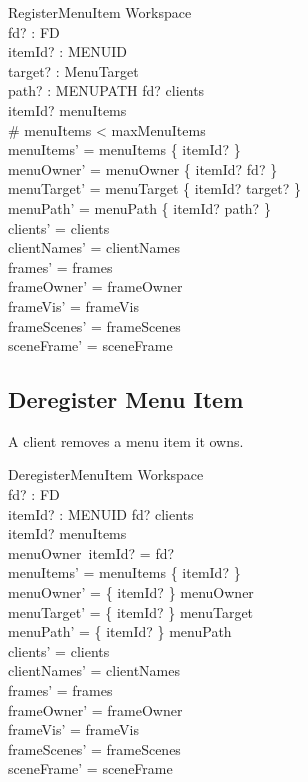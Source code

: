 \documentclass[a4paper,10pt,fleqn]{article}
\begin{document}
\begin{schema}{RegisterMenuItem}
  \Delta Workspace \\
  fd? : FD \\
  itemId? : MENUID \\
  target? : MenuTarget \\
  path? : MENUPATH
  \where
  fd? \in clients \\
  itemId? \notin menuItems \\
  \# menuItems < maxMenuItems \\
  menuItems' = menuItems \cup \{ itemId? \} \\
  menuOwner' = menuOwner \cup \{ itemId? \mapsto fd? \} \\
  menuTarget' = menuTarget \cup \{ itemId? \mapsto target? \} \\
  menuPath' = menuPath \cup \{ itemId? \mapsto path? \} \\
  clients' = clients \\
  clientNames' = clientNames \\
  frames' = frames \\
  frameOwner' = frameOwner \\
  frameVis' = frameVis \\
  frameScenes' = frameScenes \\
  sceneFrame' = sceneFrame
\end{schema}

\subsection{Deregister Menu Item}

A client removes a menu item it owns.

\begin{schema}{DeregisterMenuItem}
  \Delta Workspace \\
  fd? : FD \\
  itemId? : MENUID
  \where
  fd? \in clients \\
  itemId? \in menuItems \\
  menuOwner~itemId? = fd? \\
  menuItems' = menuItems \setminus \{ itemId? \} \\
  menuOwner' = \{ itemId? \} \ndres menuOwner \\
  menuTarget' = \{ itemId? \} \ndres menuTarget \\
  menuPath' = \{ itemId? \} \ndres menuPath \\
  clients' = clients \\
  clientNames' = clientNames \\
  frames' = frames \\
  frameOwner' = frameOwner \\
  frameVis' = frameVis \\
  frameScenes' = frameScenes \\
  sceneFrame' = sceneFrame
\end{schema}
\end{document}
